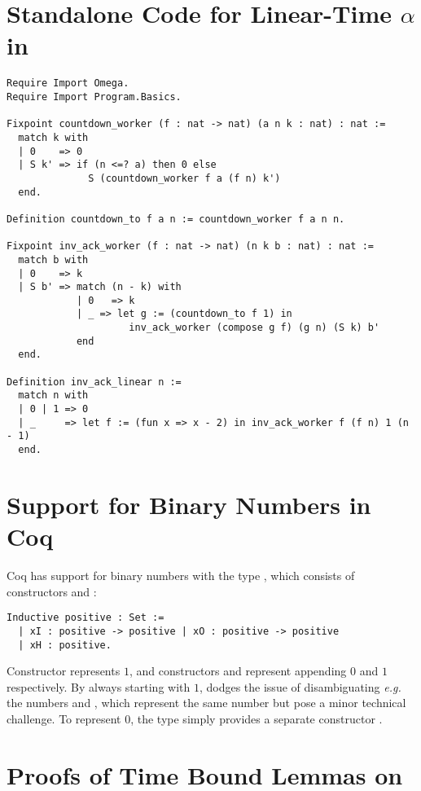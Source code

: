 \section{Standalone Code for Linear-Time $\alpha$ in }
\label{apx:standalone_nat}
\begin{lstlisting}
Require Import Omega.
Require Import Program.Basics.

Fixpoint countdown_worker (f : nat -> nat) (a n k : nat) : nat :=
  match k with
  | 0    => 0
  | S k' => if (n <=? a) then 0 else
              S (countdown_worker f a (f n) k')
  end.

Definition countdown_to f a n := countdown_worker f a n n.

Fixpoint inv_ack_worker (f : nat -> nat) (n k b : nat) : nat :=
  match b with
  | 0    => k
  | S b' => match (n - k) with
            | 0   => k
            | _ => let g := (countdown_to f 1) in
                     inv_ack_worker (compose g f) (g n) (S k) b'
            end
  end.

Definition inv_ack_linear n :=
  match n with
  | 0 | 1 => 0
  | _     => let f := (fun x => x - 2) in inv_ack_worker f (f n) 1 (n - 1)
  end.
\end{lstlisting}

\section{Support for Binary Numbers in Coq}
\label{apx:bin_in_coq}
Coq has support for binary numbers with the type , which consists 
of constructors  and :
\begin{lstlisting}
Inductive positive : Set := 
  | xI : positive -> positive | xO : positive -> positive
  | xH : positive.
\end{lstlisting}
Constructor  represents $1$, and constructors  and  represent 
appending $0$ and $1$ respectively. 
By always starting with $1$,  dodges
the issue of disambiguating \emph{e.g.} the numbers  and 
, which represent the same number but pose
a minor technical challenge. 
To represent $0$, the type  simply provides a separate constructor . 

\section{Proofs of Time Bound Lemmas on }
\label{apx:time_analysis}

